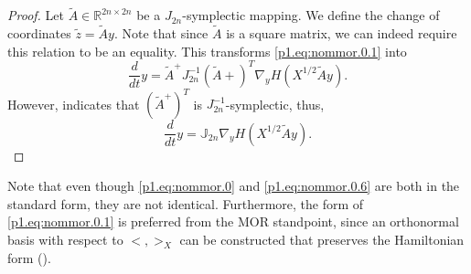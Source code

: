 \begin{proof}
Let $\tilde A\in \mathbb R^{2n\times 2n}$ be a $J_{2n}$-symplectic mapping. We define the change of coordinates $\tilde z = \tilde Ay$. Note that since $\tilde A$ is a square matrix, we can indeed require this relation to be an equality. This transforms \eqref{p1.eq:nommor.0.1} into
\begin{equation} \label{p1.eq:nommor.0.5}
	\frac{d}{dt} y = \tilde A^+ J_{2n}^{-1} (\tilde A+)^T \nabla_y H(X^{1/2}\tilde Ay).
\end{equation}
However,  indicates that $(\tilde A^+)^T$ is $J_{2n}^{-1}$-symplectic, thus,
\begin{equation} \label{p1.eq:nommor.0.6}
	\frac{d}{dt} y = \mathbb J_{2n} \nabla_y H(X^{1/2}\tilde Ay).
\end{equation}
\end{proof}
Note that even though \eqref{p1.eq:nommor.0} and \eqref{p1.eq:nommor.0.6} are both in the standard form, they are not identical. Furthermore, the form of \eqref{p1.eq:nommor.0.1} is preferred from the MOR standpoint, since an orthonormal basis with respect to $<,>_X$ can be constructed that preserves the Hamiltonian form (). 

